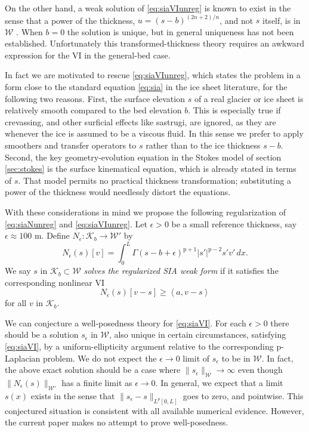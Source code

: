 \documentclass[letterpaper,final,12pt,reqno]{amsart}
\theoremstyle{claim}
\newcommand{\eps}{\epsilon}
\newcommand{\ip}[2]{\left<#1,#2\right>}
\newcommand{\pp}{{\text{p}}}
\numberwithin{equation}{section}
\numberwithin{figure}{section}
\numberwithin{table}{section}
\numberwithin{theorem}{section}
\begin{document}
On the other hand, a weak solution of \eqref{eq:siaVIunreg} is known to exist in the sense that a power of the thickness, $u=(s-b)^{(2n+2)/n}$, and not $s$ itself, is in $\mathcal{W}$ \cite{JouvetBueler2012}.  When $b=0$ the solution is unique, but in general uniqueness has not been established.  Unfortunately this transformed-thickness theory requires an awkward expression for the VI in the general-bed case.

In fact we are motivated to rescue \eqref{eq:siaVIunreg}, which states the problem in a form close to the standard equation \eqref{eq:sia} in the ice sheet literature, for the following two reasons.  First, the surface elevation $s$ of a real glacier or ice sheet is relatively smooth compared to the bed elevation $b$.  This is especially true if crevassing, and other surficial effects like sastrugi, are ignored, as they are whenever the ice is assumed to be a viscous fluid.  In this sense we prefer to apply smoothers and transfer operators to $s$ rather than to the ice thickness $s-b$.  Second, the key geometry-evolution equation in the Stokes model of section \ref{sec:stokes} is the surface kinematical equation, which is already stated in terms of $s$.  That model permits no practical thickness transformation; substituting a power of the thickness would needlessly distort the equations.

With these considerations in mind we propose the following regularization of \eqref{eq:siaNunreg} and \eqref{eq:siaVIunreg}.  Let $\eps>0$ be a small reference thickness, say $\eps \approx 100$ m.  Define $N_\eps:\mathcal{K}_b \to \mathcal{W}'$ by
\begin{equation}
N_\eps(s)[v] = \int_0^L \Gamma (s-b+\eps)^{\pp+1} |s'|^{\pp-2} s' v'\,dx. \label{eq:siaN}
\end{equation}
We say $s$ in $\mathcal{K}_b \subset \mathcal{W}$ \emph{solves the regularized SIA weak form} if it satisfies the corresponding nonlinear VI
\begin{equation}
N_\eps(s)[v-s] \ge \ip{a}{v-s} \label{eq:siaVI}
\end{equation}
for all $v$ in $\mathcal{K}_b$.

We can conjecture a well-posedness theory for \eqref{eq:siaVI}.  For each $\eps>0$ there should be a solution $s_\eps$ in $\mathcal{W}$, also unique in certain circumstances, satisfying \eqref{eq:siaVI}, by a uniform-ellipticity argument relative to the corresponding $\pp$-Laplacian problem.  We do not expect the $\eps\to 0$ limit of $s_\eps$ to be in $\mathcal{W}$.  In fact, the above exact solution should be a case where $\|s_\eps\|_{\mathcal{W}} \to \infty$ even though $\|N_\eps(s)\|_{\mathcal{W}'}$ has a finite limit as $\eps\to 0$.  In general, we expect that a limit $s(x)$ exists in the sense that $\|s_\eps-s\|_{L^p[0,L]}$ goes to zero, and pointwise.  This conjectured situation is consistent with all available numerical evidence.  However, the current paper makes no attempt to prove well-posedness.
\end{document}

